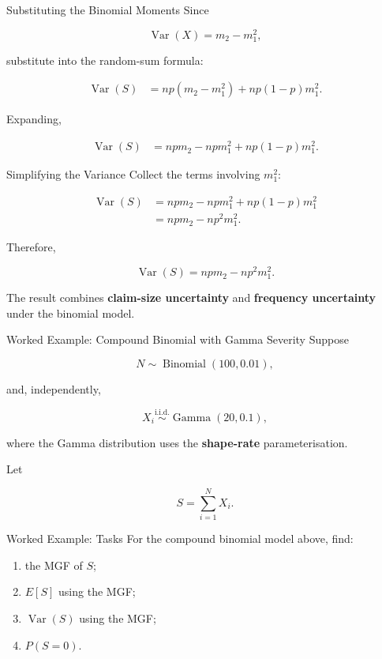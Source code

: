\documentclass[
  ignorenonframetext,
  aspectratio=169,
]{beamer}
\providecommand{\tightlist}{%
  \setlength{\itemsep}{0pt}\setlength{\parskip}{0pt}}
\begin{document}
\begin{frame}{Substituting the Binomial Moments}
\protect{}\label{substituting-the-binomial-moments}
Since

\[
\operatorname{Var}(X)=m_2-m_1^2,
\]

substitute into the random-sum formula:

\[
\begin{aligned}
\operatorname{Var}(S)
&=np(m_2-m_1^2)
+np(1-p)m_1^2.
\end{aligned}
\]

Expanding,

\[
\begin{aligned}
\operatorname{Var}(S)
&=npm_2-npm_1^2
+np(1-p)m_1^2.
\end{aligned}
\]
\end{frame}

\begin{frame}{Simplifying the Variance}
\protect{}\label{simplifying-the-variance}
Collect the terms involving \(m_1^2\):

\[
\begin{aligned}
\operatorname{Var}(S)
&=npm_2
-npm_1^2
+np(1-p)m_1^2\\
&=npm_2-np^2m_1^2.
\end{aligned}
\]

Therefore,

\[
\boxed{
\operatorname{Var}(S)
=
npm_2-np^2m_1^2
}.
\]

The result combines \textbf{claim-size uncertainty} and
\textbf{frequency uncertainty} under the binomial model.
\end{frame}

\begin{frame}{Worked Example: Compound Binomial with Gamma Severity}
\protect{}\label{worked-example-compound-binomial-with-gamma-severity}
Suppose

\[
N\sim\operatorname{Binomial}(100,0.01),
\]

and, independently,

\[
X_i\overset{\text{i.i.d.}}{\sim}\operatorname{Gamma}(20,0.1),
\]

where the Gamma distribution uses the \textbf{shape-rate}
parameterisation.

Let

\[
S=\sum_{i=1}^{N}X_i.
\]
\end{frame}

\begin{frame}{Worked Example: Tasks}
\protect{}\label{worked-example-tasks}
For the compound binomial model above, find:

\begin{enumerate}
\tightlist
\item
  the MGF of \(S\);
\item
  \(E[S]\) using the MGF;
\item
  \(\operatorname{Var}(S)\) using the MGF;
\item
  \(P(S=0)\).
\end{enumerate}
\end{frame}
\end{document}
